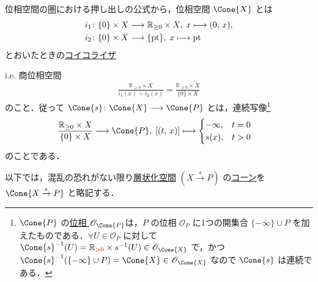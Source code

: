 \documentclass[TQFT_main]{subfiles}
\begin{document}
位相空間の圏における押し出しの公式から，位相空間 $\Cone{X}$ とは
\begin{align}
    i_1 \colon \{0\} \times X &\longrightarrow \mathbb{R}_{\ge 0} \times X,\; x \longmapsto (0,\, x), \\
    i_2 \colon \{0\} \times X &\longrightarrow \{\mathrm{pt}\},\; x \longmapsto \mathrm{pt}
\end{align}
とおいたときの\hyperref[def:eq-coeq]{コイコライザ}
\begin{center}
\end{center}
i.e. 商位相空間
\begin{align}
    \frac{\mathbb{R}_{\ge 0} \times X}{i_1 (x) \sim i_2 (x)} = \frac{\mathbb{R}_{\ge 0} \times X}{\{0\} \times X}
\end{align}
のこと．従って $\Cone{s} \colon \Cone{X} \lto \Cone{P}$ とは，連続写像\footnote{$\Cone{P}$ の\hyperref[def:topo-poset]{位相 $\mathscr{O}_{\Cone{P}}$}は，$P$ の位相 $\mathscr{O}_{P}$ に1つの開集合 $\{-\infty\} \cup P$ を加えたものである．$\forall U \in \mathscr{O}_{P}$ に対して $\Cone{s}^{-1} (U) = \mathbb{R}_{\textcolor{red}{>0}} \times s^{-1}(U) \in \mathscr{O}_{\Cone{X}}$ で，かつ $\Cone{s}^{-1}(\{-\infty\} \cup P) = \Cone{X} \in \mathscr{O}_{\Cone{X}}$ なので $\Cone{s}$ は連続である．}
\begin{align}
    \frac{\mathbb{R}_{\ge 0} \times X}{\{0\} \times X} &\lto \Cone{P},\;
    [(t,\, x)] \lmto \begin{cases}
        -\infty, &t = 0 \\
        s(x), &t > 0
    \end{cases}
\end{align}
のことである．

\begin{marker}
    以下では，混乱の恐れがない限り\hyperref[def:stratified-space]{層状化空間} $(X \xrightarrow{s} P)$ の\hyperref[def:str-cone]{コーン}を $\Cone{X \xrightarrow{s} P}$ と略記する．
\end{marker}
\end{document}

